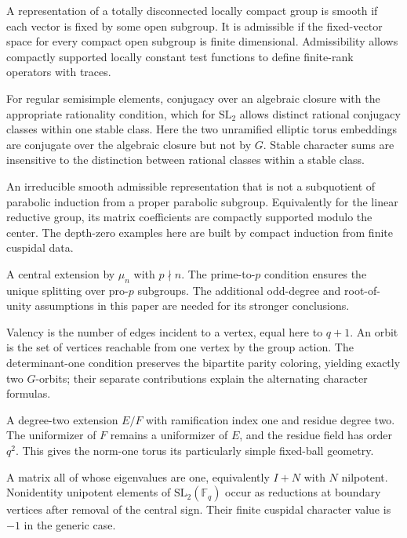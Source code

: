 \documentclass[12pt, letterpaper]{article}
\numberwithin{equation}{section}
\theoremstyle{definition}
\theoremstyle{remark}
\newcommand{\kk}{\mathbb{F}_q}
\newcommand{\Gbar}{\mathrm{SL}_2(\kk)}
\begin{document}
\begin{description}[style=nextline,leftmargin=1.5em,itemsep=5pt]
 \item[Smooth and admissible representation] A representation of a totally disconnected locally compact group is smooth if each vector is fixed by some open subgroup. It is admissible if the fixed-vector space for every compact open subgroup is finite dimensional. Admissibility allows compactly supported locally constant test functions to define finite-rank operators with traces.
 \item[Stable conjugacy] For regular semisimple elements, conjugacy over an algebraic closure with the appropriate rationality condition, which for $\mathrm{SL}_2$ allows distinct rational conjugacy classes within one stable class. Here the two unramified elliptic torus embeddings are conjugate over the algebraic closure but not by $G$. Stable character sums are insensitive to the distinction between rational classes within a stable class.
 \item[Supercuspidal representation] An irreducible smooth admissible representation that is not a subquotient of parabolic induction from a proper parabolic subgroup. Equivalently for the linear reductive group, its matrix coefficients are compactly supported modulo the center. The depth-zero examples here are built by compact induction from finite cuspidal data.
 \item[Tame central cover] A central extension by $\mu_n$ with $p\nmid n$. The prime-to-$p$ condition ensures the unique splitting over pro-$p$ subgroups. The additional odd-degree and root-of-unity assumptions in this paper are needed for its stronger conclusions.
 \item[Tree valency and vertex orbit] Valency is the number of edges incident to a vertex, equal here to $q+1$. An orbit is the set of vertices reachable from one vertex by the group action. The determinant-one condition preserves the bipartite parity coloring, yielding exactly two $G$-orbits; their separate contributions explain the alternating character formulas.
 \item[Unramified quadratic extension] A degree-two extension $E/F$ with ramification index one and residue degree two. The uniformizer of $F$ remains a uniformizer of $E$, and the residue field has order $q^2$. This gives the norm-one torus its particularly simple fixed-ball geometry.
 \item[Unipotent element] A matrix all of whose eigenvalues are one, equivalently $I+N$ with $N$ nilpotent. Nonidentity unipotent elements of $\Gbar$ occur as reductions at boundary vertices after removal of the central sign. Their finite cuspidal character value is $-1$ in the generic case.

\end{description}
\end{document}
